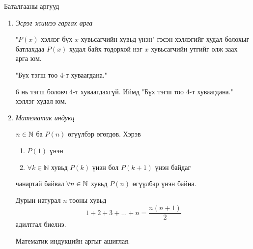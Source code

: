 \begin{frame}[allowframebreaks]{Баталгааны аргууд}
\begin{enumerate}
Теорем \ref{Нийлмэл хэллэгийн үгүйсгэл} ёсоор $$\lnot(P\Rightarrow Q)\Leftrightarrow P\land\lnot Q$$ тул батлахыг хүссэн $P\Rightarrow Q$ хэллэгийн оронд $P\land\lnot Q$ хэллэгийг үнэн гэж үзээд, түүнээс логик дүгнэлтүүд гарган  зөрчилд ($R\land\lnot R$ маягийн) эсвэл боломжгүй тэгшитгэлд (жишээ нь $0=1$) хүрч батлах арга юм. Зөрчил гарсан тул $P\land\lnot Q\Rightarrow \lnot(P\Rightarrow Q)$ худал,  тэгэхээр $P\Rightarrow Q$ үнэн. Өөрөөр хэлбэл үнэн хэллэгээс худал хэллэг гарахгүй тул $\lnot(P\Rightarrow Q)$ худал гэсэн үг.
\begin{example} $\sqrt{2}$ иррационал тоо юм.
\begin{solution}
    $P$: "$\sqrt{2}$ бол иррационал" гэе. Эсрэгээр нь таамаглая: $\sqrt{2}$ рационал буюу $\lnot P=\{\sqrt{2}=\dfrac{a}{b}\}$ ($a,b\in\mathbb{Z}$, $\text{ХИЕХ}(a,b)=1$) үнэн гэе. Тэгвэл $2=\dfrac{a^2}{b^2}$, өөрөөр хэлбэл $a^2=2b^2$. Эндээс $a^2$ тэгш тул $a$ тэгш, $a=2k$. Иймд $2b^2=4k^2 \Rightarrow b^2=2k^2$, иймээс $b$ бас тэгш. Ингэснээр $a$ ба $b$ хоёул тэгш гарч, $\text{ХИЕХ}(a,b)=1$ гэсэн нөхцөлтэй зөрчилдөнө. Иймд $\lnot P$  таамаг худал, тэгэхээр анхны таамаг $\sqrt{2}$ иррационал тоо болов.
\end{solution}\end{example}
\item \it{Эсрэг жишээ гаргах арга}  

"$P(x)$ хэллэг бүх $x$ хувьсагчийн хувьд үнэн" гэсэн хэллэгийг худал болохыг батлахдаа $P(x)$ худал байх тодорхой нэг $x$ хувьсагчийн утгийг олж заах арга юм.
\begin{example}
 "Бүх тэгш тоо 4-т хуваагдана."   
\end{example}
\begin{solution}
 6 нь тэгш боловч 4-т хуваагдахгүй. Иймд "Бүх тэгш тоо 4-т хуваагдана." хэллэг худал юм. 
\end{solution}
\item \it{Математик индукц}


$n\in\mathbb{N}$ ба $P(n)$ өгүүлбэр өгөгдөв. Хэрэв 
\begin{enumerate}
    \item $P(1)$ үнэн
    \item $\forall k\in\mathbb{N}$ хувьд $ P(k)$ үнэн бол $P(k+1)$ үнэн байдаг
\end{enumerate} чанартай байвал $\forall n\in\mathbb{N}$ хувьд $P(n)$ өгүүлбэр үнэн байна. 
\begin{example}
Дурын натурал $n$ тооны хувьд 
\begin{equation}
1 + 2 + 3 + \dots + n = \frac{n(n+1)}{2}
\end{equation}
адилтгал биелнэ.
\begin{prof}
Математик индукцийн аргыг ашиглая.


\end{prof}
\end{example}
\end{enumerate}
\end{frame}
